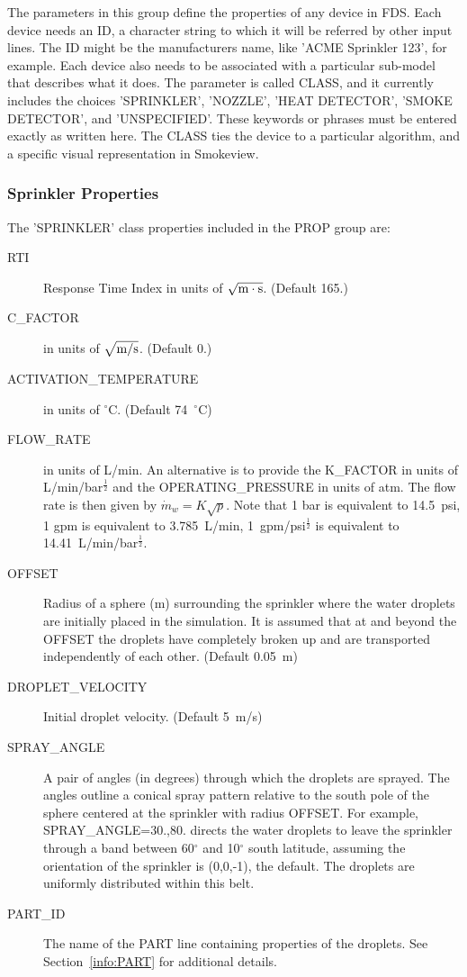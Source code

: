 \documentclass[11pt]{book}
\newcommand{\dm}{\dot{m}}
\newcommand{\ha}{\frac{1}{2}}
\begin{document}
The parameters in this group define the properties of any device in FDS.
Each device needs an {\ct ID}, a character string to which it will
be referred by other input lines. The {\ct ID} might be the manufacturers
name, like {\ct 'ACME Sprinkler 123'}, for example. Each device also
needs to be associated with a particular sub-model that describes what it does.
The parameter is called {\ct CLASS}, and it currently includes the choices
{\ct 'SPRINKLER'}, {\ct 'NOZZLE'}, {\ct 'HEAT DETECTOR'},
{\ct 'SMOKE DETECTOR'}, and {\ct 'UNSPECIFIED'}. These keywords or phrases
must be entered exactly as written here.
The {\ct CLASS} ties the device to a particular algorithm, and a specific visual
representation in Smokeview.

\subsubsection{Sprinkler Properties}

The {\ct 'SPRINKLER'} class properties included in the {\ct PROP} group are:
\begin{description}
\item[{\ct RTI}] Response Time Index in units of $\sqrt{\hbox{m}\cdot \hbox{s}}$. (Default 165.)
\item[{\ct C\_FACTOR}] in units of $\sqrt{\hbox{m/s}}$. (Default 0.)
\item[{\ct ACTIVATION\_TEMPERATURE}] in units of $^\circ$C. (Default 74~$^\circ$C)
\item[{\ct FLOW\_RATE}] in units of L/min.
An alternative is to provide the {\ct K\_FACTOR} in units of L/min/bar$^\ha$ and the
{\ct OPERATING\_PRESSURE} in units of atm.
The flow rate is then given by $ \dm_w = K \sqrt{p}$. Note that 1 bar is equivalent to
14.5~psi, 1 gpm is equivalent to 3.785~L/min, 1~gpm/psi$^\ha$ is
equivalent to 14.41~L/min/bar$^\ha$.
\item[{\ct OFFSET}] Radius of a sphere (m) surrounding the
sprinkler where the water droplets are initially placed in the simulation. It is assumed that
at and beyond the {\ct OFFSET} the droplets have completely broken
up and are transported independently of each other. (Default 0.05~m)
\item[{\ct DROPLET\_VELOCITY}]  Initial droplet velocity. (Default 5~m/s)
\item[{\ct SPRAY\_ANGLE}] A pair of angles (in degrees) through which the droplets are sprayed.
The angles outline a conical spray pattern relative to the
south pole of the sphere centered at the sprinkler with radius {\ct OFFSET}.
For example, {\ct SPRAY\_ANGLE=30.,80.} directs the water droplets to leave
the sprinkler through a band between 60$^\circ$ and 10$^\circ$ south latitude, assuming the orientation of
the sprinkler is (0,0,-1), the default. The droplets are uniformly
distributed within this belt.
\item[{\ct PART\_ID}] The name of the {\ct PART} line containing properties of the droplets.
See Section~\ref{info:PART} for additional details.
\end{description}
\end{document}
